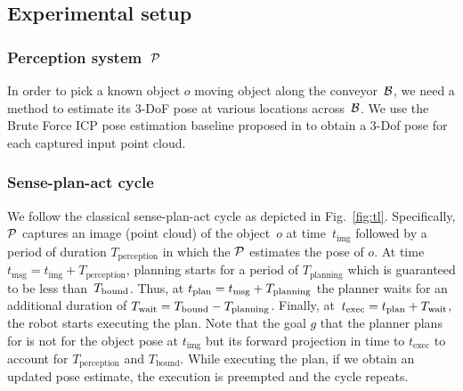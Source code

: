 \documentclass[conference]{IEEEtran}
\begin{document}
\subsection{Experimental setup}
\subsubsection{Perception system~$\mathcal{P}$}
In order to pick a known object $o$ moving object along the conveyor~$\mathcal{B}$, we need a method to estimate its 3-DoF pose at various locations across~$\mathcal{B}$. We use the Brute Force ICP pose estimation baseline proposed in \cite{perch} to obtain a 3-Dof pose for each captured input point cloud.

\subsubsection{Sense-plan-act cycle}
We follow the classical sense-plan-act cycle as depicted in Fig.~\ref{fig:tl}.
%
Specifically, 
$\mathcal{P}$ captures an image (point cloud) of the object~$o$ at time~$t_{\textrm{img}}$
followed by a period of duration $T_{\textrm{perception}}$ in which the $\mathcal{P}$ estimates the pose of $o$.
At time $t_{\textrm{msg}} = t_{\textrm{img}} + T_{\textrm{perception}}$, planning starts for a period of $T_{\textrm{planning}}$ which is guaranteed to be less than~$T_{\textrm{bound}}$.
Thus, at $t_{\textrm{plan}} = t_{\textrm{msg}} + T_{\rm planning}$ the planner waits for an additional duration of $T_{\rm wait} = T_{\textrm{bound}} - T_{\rm planning}$.
Finally, at~$t_{\textrm{exec}} = t_{\textrm{plan}} + T_{\rm wait}$, the robot starts executing the plan. Note that the goal $g$ that the planner plans for is not for the object pose at $t_{\textrm{img}}$ but its forward projection in time to $t_{\textrm{exec}}$ to account for $T_{\textrm{perception}}$ and $T_{\textrm{bound}}$.
While executing the plan, if we obtain an updated pose estimate, the execution is preempted and the cycle repeats.
\end{document}

